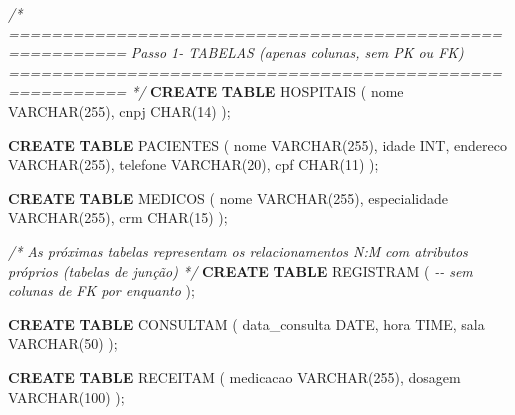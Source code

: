 \documentclass[
]{book}
\newenvironment{Shaded}{\begin{snugshade}}{\end{snugshade}}
\newcommand{\CommentTok}[1]{\textcolor[rgb]{0.56,0.35,0.01}{\textit{#1}}}
\newcommand{\DataTypeTok}[1]{\textcolor[rgb]{0.13,0.29,0.53}{#1}}
\newcommand{\DecValTok}[1]{\textcolor[rgb]{0.00,0.00,0.81}{#1}}
\newcommand{\KeywordTok}[1]{\textcolor[rgb]{0.13,0.29,0.53}{\textbf{#1}}}
\newcommand{\NormalTok}[1]{#1}
\begin{document}
\begin{Shaded}
\begin{Highlighting}[]

\CommentTok{/* =========================================================}
\CommentTok{   Passo 1{-} TABELAS (apenas colunas, sem PK ou FK)}
\CommentTok{   ========================================================= */}
\KeywordTok{CREATE} \KeywordTok{TABLE}\NormalTok{ HOSPITAIS }
\NormalTok{(}
\NormalTok{    nome    }\DataTypeTok{VARCHAR}\NormalTok{(}\DecValTok{255}\NormalTok{),}
\NormalTok{    cnpj    }\DataTypeTok{CHAR}\NormalTok{(}\DecValTok{14}\NormalTok{)}
\NormalTok{);}

\KeywordTok{CREATE} \KeywordTok{TABLE}\NormalTok{ PACIENTES }
\NormalTok{(}
\NormalTok{    nome        }\DataTypeTok{VARCHAR}\NormalTok{(}\DecValTok{255}\NormalTok{),}
\NormalTok{    idade       }\DataTypeTok{INT}\NormalTok{,}
\NormalTok{    endereco    }\DataTypeTok{VARCHAR}\NormalTok{(}\DecValTok{255}\NormalTok{),}
\NormalTok{    telefone    }\DataTypeTok{VARCHAR}\NormalTok{(}\DecValTok{20}\NormalTok{),}
\NormalTok{    cpf         }\DataTypeTok{CHAR}\NormalTok{(}\DecValTok{11}\NormalTok{)}
\NormalTok{);}

\KeywordTok{CREATE} \KeywordTok{TABLE}\NormalTok{ MEDICOS }
\NormalTok{(}
\NormalTok{    nome            }\DataTypeTok{VARCHAR}\NormalTok{(}\DecValTok{255}\NormalTok{),}
\NormalTok{    especialidade   }\DataTypeTok{VARCHAR}\NormalTok{(}\DecValTok{255}\NormalTok{),}
\NormalTok{    crm             }\DataTypeTok{CHAR}\NormalTok{(}\DecValTok{15}\NormalTok{)}
\NormalTok{);}

\CommentTok{/* As próximas tabelas representam os relacionamentos N:M}
\CommentTok{   com atributos próprios (tabelas de junção) */}
\KeywordTok{CREATE} \KeywordTok{TABLE}\NormalTok{ REGISTRAM }
\NormalTok{(}
    \CommentTok{{-}{-} sem colunas de FK por enquanto}
\NormalTok{);}

\KeywordTok{CREATE} \KeywordTok{TABLE}\NormalTok{ CONSULTAM }
\NormalTok{(}
\NormalTok{    data\_consulta   }\DataTypeTok{DATE}\NormalTok{,}
\NormalTok{    hora            }\DataTypeTok{TIME}\NormalTok{,}
\NormalTok{    sala            }\DataTypeTok{VARCHAR}\NormalTok{(}\DecValTok{50}\NormalTok{)}
\NormalTok{);}

\KeywordTok{CREATE} \KeywordTok{TABLE}\NormalTok{ RECEITAM }
\NormalTok{(}
\NormalTok{    medicacao       }\DataTypeTok{VARCHAR}\NormalTok{(}\DecValTok{255}\NormalTok{),}
\NormalTok{    dosagem         }\DataTypeTok{VARCHAR}\NormalTok{(}\DecValTok{100}\NormalTok{)}
\NormalTok{);}


\end{Highlighting}
\end{Shaded}
\end{document}

